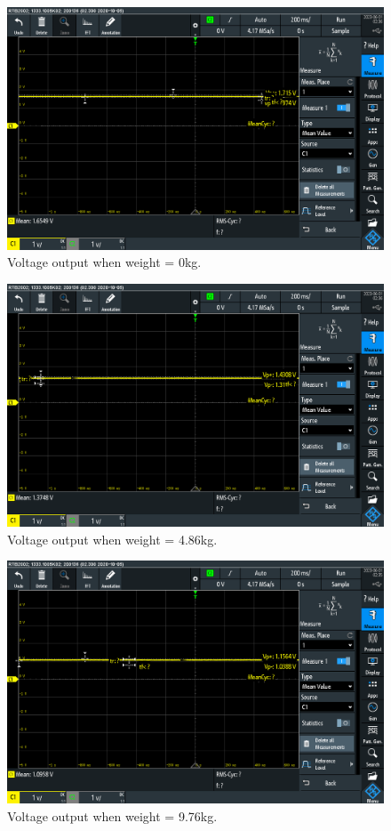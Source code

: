 \begin{figure}[h]
\centering
\includegraphics[width=\textwidth]{final-report/assets/0kg_exp.png}
\caption{Voltage output when weight = 0kg.}
\end{figure}

\begin{figure}[h]
\centering
\includegraphics[width=\textwidth]{final-report/assets/5kg_exp.png}
\caption{Voltage output when weight = 4.86kg.}
\end{figure}

\begin{figure}[h]
\centering
\includegraphics[width=\textwidth]{final-report/assets/10kg_exp.png}
\caption{Voltage output when weight = 9.76kg.}
\end{figure}

